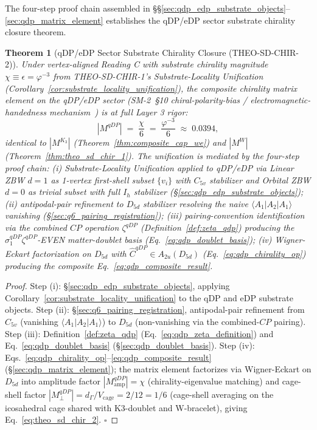 \documentclass[11pt,letterpaper]{article}
\newtheorem{theorem}{Theorem}[section]
\newcommand{\phig}{\varphi}
\newcommand{\Kthree}{\ensuremath{K_3}}
\begin{document}
The four-step proof chain assembled in \S\S\ref{sec:qdp_edp_substrate_objects}--\ref{sec:qdp_matrix_element} establishes the qDP/eDP sector substrate chirality closure theorem.

\begin{theorem}[qDP/eDP Sector Substrate Chirality Closure (THEO-SD-CHIR-2)]\label{thm:theo_sd_chir_2}
Under vertex-aligned Reading C with substrate chirality magnitude $\chi \equiv \epsilon = \phig^{-3}$ from THEO-SD-CHIR-1's Substrate-Locality Unification (Corollary~\ref{cor:substrate_locality_unification}), the composite chirality matrix element on the qDP/eDP sector (SM-2~\S10 chiral-polarity-bias / electromagnetic-handedness mechanism~\cite{abshier_sm2}) is at full Layer 3 rigor:
\begin{equation}\label{eq:theo_sd_chir_2}
|M^{qDP}| \;=\; \frac{\chi}{6} \;=\; \frac{\phig^{-3}}{6} \;\approx\; 0.0394,
\end{equation}
identical to $|M^{\Kthree}|$ (Theorem~\ref{thm:composite_cap_we}) and $|M^W|$ (Theorem~\ref{thm:theo_sd_chir_1}). The unification is mediated by the four-step proof chain: (i) Substrate-Locality Unification applied to qDP/eDP via Linear ZBW $d=1$ as 1-vertex first-shell subset $\{v_i\}$ with $C_{5v}$ stabilizer and Orbital ZBW $d=0$ as trivial subset with full $I_h$ stabilizer (\S\ref{sec:qdp_edp_substrate_objects}); (ii) antipodal-pair refinement to $D_{5d}$ stabilizer resolving the naive $\langle A_1 | A_2 | A_1 \rangle$ vanishing (\S\ref{sec:q6_pairing_registration}); (iii) pairing-convention identification via the combined $CP$ operation $\zeta^{qDP}$ (Definition~\ref{def:zeta_qdp}) producing the $\sigma_1^{qDP}\zeta^{qDP}$-EVEN matter-doublet basis (Eq.~\eqref{eq:qdp_doublet_basis}); (iv) Wigner-Eckart factorization on $D_{5d}$ with $\hat{C}^{qDP} \in A_{2u}(D_{5d})$ (Eq.~\eqref{eq:qdp_chirality_op}) producing the composite Eq.~\eqref{eq:qdp_composite_result}.
\end{theorem}

\begin{proof}
Step (i): \S\ref{sec:qdp_edp_substrate_objects}, applying Corollary~\ref{cor:substrate_locality_unification} to the qDP and eDP substrate objects. Step (ii): \S\ref{sec:q6_pairing_registration}, antipodal-pair refinement from $C_{5v}$ (vanishing $\langle A_1 | A_2 | A_1 \rangle$) to $D_{5d}$ (non-vanishing via the combined-$CP$ pairing). Step (iii): Definition~\ref{def:zeta_qdp} (Eq.~\eqref{eq:qdp_zeta_definition}) and Eq.~\eqref{eq:qdp_doublet_basis} (\S\ref{sec:qdp_doublet_basis}). Step (iv): Eqs.~\eqref{eq:qdp_chirality_op}--\eqref{eq:qdp_composite_result} (\S\ref{sec:qdp_matrix_element}); the matrix element factorizes via Wigner-Eckart on $D_{5d}$ into amplitude factor $|M_{\text{amp}}^{qDP}| = \chi$ (chirality-eigenvalue matching) and cage-shell factor $|M_\perp^{qDP}| = d_\Gamma/V_{\text{cage}} = 2/12 = 1/6$ (cage-shell averaging on the icosahedral cage shared with K3-doublet and W-bracelet), giving Eq.~\eqref{eq:theo_sd_chir_2}.
$\square$
\end{proof}
\end{document}
